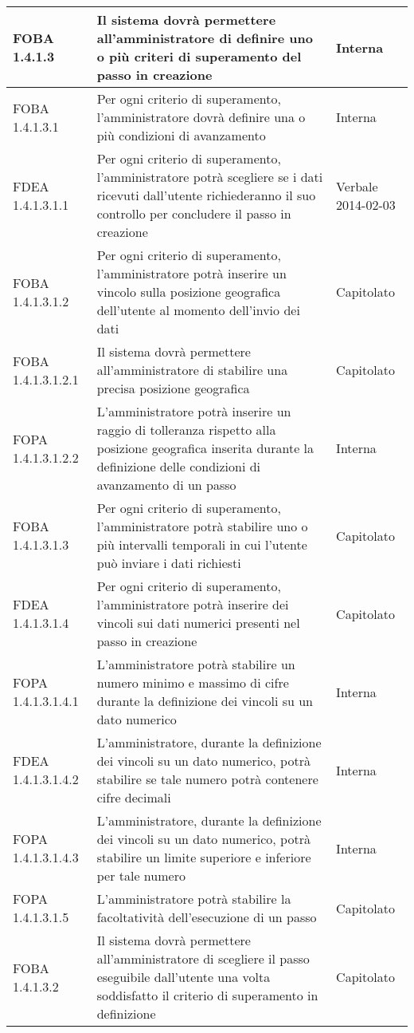 \begin{longtable}{lXp{}}
\midrule
FOBA 1.4.1.3&Il sistema dovrà permettere all'amministratore di definire uno o più criteri di superamento del passo in creazione&Interna\\
\midrule
FOBA 1.4.1.3.1&Per ogni criterio di superamento, l'amministratore dovrà definire una o più condizioni di avanzamento&Interna\\
\midrule
FDEA 1.4.1.3.1.1&Per ogni criterio di superamento, l'amministratore potrà scegliere se i dati ricevuti dall'utente richiederanno il suo controllo per concludere il passo in creazione&Verbale 2014-02-03\\
\midrule
FOBA 1.4.1.3.1.2&Per ogni criterio di superamento, l'amministratore potrà inserire un vincolo sulla posizione geografica dell'utente al momento dell'invio dei dati&Capitolato\\
\midrule
FOBA 1.4.1.3.1.2.1&Il sistema dovrà permettere all'amministratore di stabilire una precisa posizione geografica&Capitolato\\
\midrule
FOPA 1.4.1.3.1.2.2&L'amministratore potrà inserire un raggio di tolleranza rispetto alla posizione geografica inserita durante la definizione delle condizioni di avanzamento di un passo&Interna\\
\midrule
FOBA 1.4.1.3.1.3&Per ogni criterio di superamento, l'amministratore potrà stabilire uno o più intervalli temporali in cui l'utente può inviare i dati richiesti&Capitolato\\
\midrule
FDEA 1.4.1.3.1.4&Per ogni criterio di superamento, l'amministratore potrà inserire dei vincoli sui dati numerici presenti nel passo in creazione&Capitolato\\
\midrule
FOPA 1.4.1.3.1.4.1&L'amministratore potrà stabilire un numero minimo e massimo di cifre durante la definizione dei vincoli su un dato numerico&Interna\\
\midrule
FDEA 1.4.1.3.1.4.2&L'amministratore, durante la definizione dei vincoli su un dato numerico, potrà stabilire se tale numero potrà contenere cifre decimali&Interna\\
\midrule
FOPA 1.4.1.3.1.4.3&L'amministratore, durante la definizione dei vincoli su un dato numerico, potrà stabilire un limite superiore e inferiore per tale numero&Interna\\
\midrule
FOPA 1.4.1.3.1.5&L'amministratore potrà stabilire la facoltatività dell'esecuzione di un passo&Capitolato\\
\midrule
FOBA 1.4.1.3.2&Il sistema dovrà permettere all'amministratore di scegliere il passo eseguibile dall'utente una volta soddisfatto il criterio di superamento in definizione&Capitolato\\

\end{longtable}
